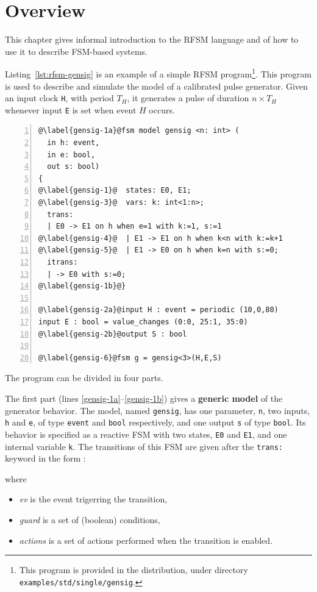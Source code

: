 \chapter{Overview}
\label{cha:overview}

This chapter gives informal introduction to the RFSM language and of how to use it to describe 
FSM-based systems.

\medskip
Listing~\ref{lst:rfsm-gensig} is an example of a simple RFSM program\footnote{This program is
  provided in the distribution, under directory \texttt{examples/std/single/gensig}.}. This program is
used to describe and simulate the model of a calibrated pulse generator. Given an input clock
\verb|H|, with period $T_H$, it generates a pulse of duration $n \times T_H$ whenever input
\texttt{E} is set when event $H$ occurs.

\begin{lstlisting}[language=Rfsm,frame=single,numbers=left,caption=A simple RFSM
  program,label={lst:rfsm-gensig}]
@\label{gensig-1a}@fsm model gensig <n: int> (
  in h: event,
  in e: bool,
  out s: bool)
{
@\label{gensig-1}@  states: E0, E1;
@\label{gensig-3}@  vars: k: int<1:n>;
  trans:
  | E0 -> E1 on h when e=1 with k:=1, s:=1
@\label{gensig-4}@  | E1 -> E1 on h when k<n with k:=k+1
@\label{gensig-5}@  | E1 -> E0 on h when k=n with s:=0;
  itrans:
  | -> E0 with s:=0;
@\label{gensig-1b}@}

@\label{gensig-2a}@input H : event = periodic (10,0,80)
input E : bool = value_changes (0:0, 25:1, 35:0)
@\label{gensig-2b}@output S : bool 

@\label{gensig-6}@fsm g = gensig<3>(H,E,S)
\end{lstlisting}

\medskip
The program can be divided in four parts.

\medskip The first part (lines \ref{gensig-1a}--\ref{gensig-1b}) gives a \textbf{generic model} of
the generator behavior. The model, named \verb|gensig|, has one parameter, \verb|n|, two inputs,
\verb|h| and \verb|e|, of type \verb|event| and \verb|bool| respectively, and one output \verb|s| of
type \verb|bool|. Its behavior is specified as a reactive FSM with two states, \verb|E0| and
\verb|E1|, and one internal variable \verb|k|. The transitions of this FSM are given after the
\verb|trans:| keyword in the form :
\begin{center}
\end{center}
where
\begin{itemize}
\item \emph{ev} is the event trigerring the transition,
\item \emph{guard} is a set of (boolean) conditions,
\item \emph{actions} is a set of actions performed when the transition is enabled.
\end{itemize}

